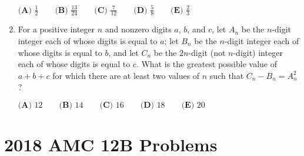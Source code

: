 \documentclass{article}
\begin{document}
\begin{enumerate}[label=\arabic*., itemsep=0.5em]
\(
\textbf{(A) }\frac{1}{2}\qquad
\textbf{(B) }\frac{13}{24} \qquad
\textbf{(C) }\frac{7}{12} \qquad
\textbf{(D) }\frac{5}{8} \qquad
\textbf{(E) }\frac{2}{3}\qquad
\)\par \vspace{0.5em}\item For a positive integer \(n\) and nonzero digits \(a\), \(b\), and \(c\), let \(A_n\) be the \(n\)-digit integer each of whose digits is equal to \(a\); let \(B_n\) be the \(n\)-digit integer each of whose digits is equal to \(b\), and let \(C_n\) be the \(2n\)-digit (not \(n\)-digit) integer each of whose digits is equal to \(c\). What is the greatest possible value of \(a + b + c\) for which there are at least two values of \(n\) such that \(C_n - B_n = A_n^2\)?

\(\textbf{(A) } 12 \qquad \textbf{(B) } 14 \qquad \textbf{(C) } 16 \qquad \textbf{(D) } 18 \qquad \textbf{(E) } 20\)\par \vspace{0.5em}
\end{enumerate}
\newpage\section*{2018 AMC 12B Problems}
\end{document}
